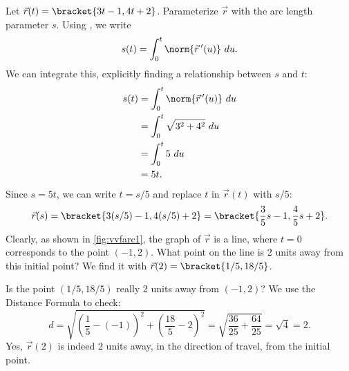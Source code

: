 \begin{example}\label{ex_vvfarc1}
Let $\vec r(t) =\bracket{3t-1,4t+2}$. Parameterize $\vec r$ with the arc length parameter $s$.
\solution
Using , we write
\[s(t) = \int_0^t \norm{\vec r\,'(u)}\ du.\]
We can integrate this, explicitly finding a relationship between $s$ and $t$:
\begin{align*}
s(t) &= \int_0^t \norm{\vec r\,'(u)}\ du \\
			&= \int_0^t \sqrt{3^2+4^2}\ du\\
			&= \int_0^t 5\ du\\
			&= 5t.
\end{align*}
Since $s=5t$, we can write $t=s/5$ and replace $t$ in $\vec r(t)$ with $s/5$:
\[\vec r(s) =\bracket{3(s/5)-1, 4(s/5)+2}=\bracket{\frac35s-1,\frac45s+2}.\]
Clearly, as shown in \autoref{fig:vvfarc1}, the graph of $\vec r$ is a line, where $t=0$ corresponds to the point $(-1,2)$. What point on the line is 2 units away from this initial point? We find it with $\vec r(2) =\bracket{1/5, 18/5}$. 


Is the point $(1/5,18/5)$ really 2 units away from $(-1,2)$? We use the Distance Formula to check:
\[
d = \sqrt{\left(\frac15-(-1)\right)^2+ \left(\frac{18}5-2\right)^2} = \sqrt{\frac{36}{25}+\frac{64}{25}} = \sqrt{4}=2.
\]
Yes, $\vec r(2)$ is indeed 2 units away, in the direction of travel, from the initial point.
\end{example}

